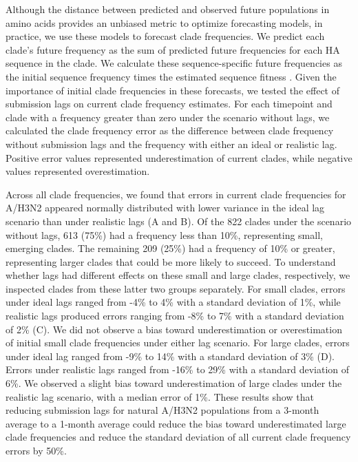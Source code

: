 \documentclass[9pt,lineno]{elife}
\begin{document}
Although the distance between predicted and observed future populations in amino acids provides an unbiased metric to optimize forecasting models, in practice, we use these models to forecast clade frequencies.
We predict each clade's future frequency as the sum of predicted future frequencies for each HA sequence in the clade.
We calculate these sequence-specific future frequencies as the initial sequence frequency times the estimated sequence fitness \citep{Luksza:2014hj,Huddleston2020}.
Given the importance of initial clade frequencies in these forecasts, we tested the effect of submission lags on current clade frequency estimates.
For each timepoint and clade with a frequency greater than zero under the scenario without lags, we calculated the clade frequency error as the difference between clade frequency without submission lags and the frequency with either an ideal or realistic lag.
Positive error values represented underestimation of current clades, while negative values represented overestimation.

Across all clade frequencies, we found that errors in current clade frequencies for A/H3N2 appeared normally distributed with lower variance in the ideal lag scenario than under realistic lags (A and B).
Of the 822 clades under the scenario without lags, 613 (75\%) had a frequency less than 10\%, representing small, emerging clades.
The remaining 209 (25\%) had a frequency of 10\% or greater, representing larger clades that could be more likely to succeed.
To understand whether lags had different effects on these small and large clades, respectively, we inspected clades from these latter two groups separately.
For small clades, errors under ideal lags ranged from -4\% to 4\% with a standard deviation of 1\%, while realistic lags produced errors ranging from -8\% to 7\% with a standard deviation of 2\% (C).
We did not observe a bias toward underestimation or overestimation of initial small clade frequencies under either lag scenario.
For large clades, errors under ideal lag ranged from -9\% to 14\% with a standard deviation of 3\% (D).
Errors under realistic lags ranged from -16\% to 29\% with a standard deviation of 6\%.
We observed a slight bias toward underestimation of large clades under the realistic lag scenario, with a median error of 1\%.
These results show that reducing submission lags for natural A/H3N2 populations from a 3-month average to a 1-month average could reduce the bias toward underestimated large clade frequencies and reduce the standard deviation of all current clade frequency errors by 50\%.
\end{document}
